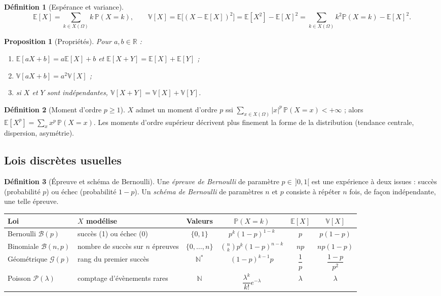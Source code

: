 \documentclass[11pt,a4paper]{article}
\newcommand{\E}{\mathbb{E}}
\newcommand{\V}{\mathbb{V}}
\renewcommand{\P}{\mathbb{P}}
\newcommand{\R}{\mathbb{R}}
\newcommand{\N}{\mathbb{N}}
\newcommand{\1}{\mathbf{1}}
\theoremstyle{definition}
\newtheorem*{definition}{Définition}
\theoremstyle{plain}
\newtheorem*{proposition}{Proposition}
\theoremstyle{remark}
\begin{document}
\begin{definition}[Espérance et variance]
\[
\E[X]=\sum_{k\in X(\Omega)}k\,\P(X=k),\qquad
\V[X]=\E\big[(X-\E[X])^2\big]=\E[X^2]-\E[X]^2=\sum_{k\in X(\Omega)}k^2\P(X=k)-\E[X]^2.
\]
\end{definition}

\begin{proposition}[Propriétés]
Pour $a,b\in\R$ :
\begin{enumerate}
  \item $\E[aX+b]=a\E[X]+b$ et $\E[X+Y]=\E[X]+\E[Y]$ ;
  \item $\V[aX+b]=a^2\V[X]$ ;
  \item si $X$ et $Y$ sont indépendantes, $\V[X+Y]=\V[X]+\V[Y]$.
\end{enumerate}
\end{proposition}

\begin{definition}[Moment d'ordre $p\ge1$]
$X$ admet un moment d'ordre $p$ ssi $\sum_{x\in X(\Omega)}|x|^p\,\P(X=x)<+\infty$ ; alors $\E[X^p]=\sum_{x}x^p\,\P(X=x)$.
Les moments d'ordre supérieur décrivent plus finement la forme de la distribution (tendance centrale, dispersion, asymétrie).
\end{definition}

\subsection{Lois discrètes usuelles}

\begin{definition}[Épreuve et schéma de Bernoulli]
Une \emph{épreuve de Bernoulli} de paramètre $p\in\,]0,1[$ est une expérience à deux issues : succès (probabilité $p$) ou échec (probabilité $1-p$). Un \emph{schéma de Bernoulli} de paramètres $n$ et $p$ consiste à répéter $n$ fois, de façon indépendante, une telle épreuve.
\end{definition}

\begin{center}
\small
\begin{tabular}{@{}llcccc@{}}
\toprule
\textbf{Loi} & \textbf{$X$ modélise} & \textbf{Valeurs} & $\P(X=k)$ & $\E[X]$ & $\V[X]$\\
\midrule
Bernoulli $\mathcal{B}(p)$ & succès (1) ou échec (0) & $\{0,1\}$ & $p^k(1-p)^{1-k}$ & $p$ & $p(1-p)$\\[3pt]
Binomiale $\mathcal{B}(n,p)$ & nombre de succès sur $n$ épreuves & $\{0,\dots,n\}$ & $\binom{n}{k}p^k(1-p)^{n-k}$ & $np$ & $np(1-p)$\\[3pt]
Géométrique $\mathcal{G}(p)$ & rang du premier succès & $\N^*$ & $(1-p)^{k-1}p$ & $\dfrac1p$ & $\dfrac{1-p}{p^2}$\\[6pt]
Poisson $\mathcal{P}(\lambda)$ & comptage d'évènements rares & $\N$ & $\dfrac{\lambda^k}{k!}e^{-\lambda}$ & $\lambda$ & $\lambda$\\
\bottomrule
\end{tabular}
\end{center}
\end{document}
